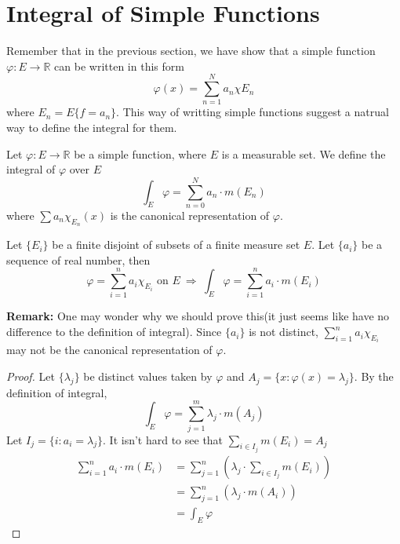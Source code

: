 \documentclass[lang=en, 12pt]{elegantbook}
\newcommand{\RR}{\mathbb{R}}
\begin{document}
        \section{Integral of Simple Functions}
            Remember that in the previous section, we have show that a simple function $\varphi:E \to \RR$ can be written in this form
        $$\varphi(x)  = \sum_{n=1}^{N} a_n \chi{E_n}$$
        where $E_n = E\{f=a_n\}$. This way of writting simple functions suggest a natrual way to define the integral for them.
            \begin{definition}
                Let $\varphi:E \to \RR$ be a simple function, where $E$ is a measurable set. We define the integral of $\varphi$ over $E$
                \begin{equation}
                    \int_E \varphi = \sum_{n=0}^{N} a_n \cdot m(E_n)
                \end{equation}
            where $\sum a_n \chi_{E_n}(x)$ is the canonical representation of $\varphi$. 
            \end{definition}
            \begin{lemma}\label{thm:simpleintlemma}
                Let $\{E_i\}$ be a finite disjoint of subsets of a finite measure set $E$. Let $\{a_i\}$ be a sequence of real number, then
            $$\varphi = \sum_{i=1}^n a_i \chi_{E_i} \mbox{ on } E \ \Rightarrow \ \int_E \varphi = \sum_{i=1}^{n} a_i \cdot m(E_i)$$\par
                \textbf{Remark:} One may wonder why we should prove this(it just seems like have no difference to the definition of integral).
            Since $\{a_i\}$ is not distinct, $\sum_{i=1}^n a_i \chi_{E_i}$ may not be the canonical representation of $\varphi$.\par
            \end{lemma}
            \begin{proof}
                Let $\{\lambda_j\}$ be distinct values taken by $\varphi$ and $A_j=\{x:\varphi(x)=\lambda_j\}$. By the definition of integral,
            $$\int_E \varphi = \sum_{j=1}^{m} \lambda_j \cdot m(A_j)$$ 
            Let $I_j = \{i:a_i =\lambda_j\}$. It isn't hard to see that $\sum_{i \in I_j} m(E_i) = A_j$
            \begin{equation}
                \begin{aligned}
                    \sum_{i=1}^{n} a_i \cdot m(E_i) &= \sum_{j=1}^{n} (\lambda_j \cdot \sum_{i \in I_j} m(E_i))\\
                    &= \sum_{j=1}^{n} (\lambda_j \cdot m(A_i))\\
                    &= \int_E \varphi
                \end{aligned}
            \end{equation}
            \end{proof}
\end{document}
